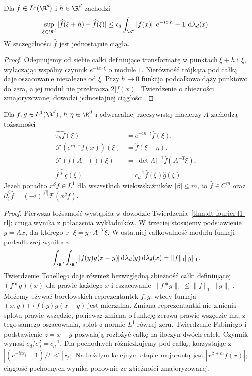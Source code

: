 \begin{wniosek}
\label{cor:dt-fourier-uniform-continuity}
Dla $f\in L^1(\R^d)$ i $h\in\R^d$ zachodzi
\[
 \sup_{\xi\in\R^d}|\widehat f(\xi+h)-\widehat f(\xi)|
 \le c_d\int_{\R^d}|f(x)|\,|e^{-ix\cdot h}-1|
 \,\mathrm d\lambda_d(x).
\]
W szczególności $\widehat f$ jest jednostajnie ciągła.
\end{wniosek}
\begin{proof}
Odejmujemy od siebie całki definiujące transformatę
w punktach $\xi+h$ i $\xi$, wyłączając wspólny
czynnik $e^{-ix\cdot\xi}$ o module $1$.
Nierówność trójkąta pod całką daje oszacowanie
niezależne od $\xi$. Przy $h\to0$ funkcja podcałkowa
dąży punktowo do zera, a jej moduł nie przekracza
$2|f(x)|$. Twierdzenie o zbieżności zmajoryzowanej
dowodzi jednostajnej ciągłości.
\end{proof}

\begin{stwierdzenie}
\label{prop:dt-fourier-l1-rules}
Dla $f,g\in L^1(\R^d)$, $h,\eta\in\R^d$ i odwracalnej
rzeczywistej macierzy $A$ zachodzą tożsamości
\[
\begin{aligned}
 \widehat{\tau_h f}(\xi)&=e^{-ih\cdot\xi}\widehat f(\xi),\\
 \mathcal F(e^{i\eta\cdot x}f(x))(\xi)&=\widehat f(\xi-\eta),\\
 \mathcal F(f(A\,\cdot))(\xi)&=
 |\det A|^{-1}\widehat f(A^{-T}\xi),\\
 \widehat{f*g}(\xi)&=c_d^{-1}\widehat f(\xi)\widehat g(\xi).
\end{aligned}
\]
Jeżeli ponadto $x^\beta f\in L^1$ dla wszystkich
wielowskaźników $|\beta|\le m$, to $\widehat f\in C^m$
oraz $\partial_\xi^\beta\widehat f=(-i)^{|\beta|}
\mathcal F(x^\beta f)$.
\end{stwierdzenie}
\begin{proof}
Pierwsza tożsamość wystąpiła w dowodzie
Twierdzenia~\ref{thm:dt-fourier-l1-rl}; druga wynika z
połączenia wykładników. W trzeciej stosujemy podstawienie
$y=Ax$, dla którego $x\cdot\xi=y\cdot A^{-T}\xi$.
W ostatniej całkowalność modułu funkcji podcałkowej
wynika z
\[
 \int_{\R^d}\int_{\R^d}|f(y)g(x-y)|
 \,\mathrm d\lambda_d(y)\,\mathrm d\lambda_d(x)
 =\|f\|_1\|g\|_1.
\]
Twierdzenie Tonellego daje również bezwzględną zbieżność
całki definiującej $(f*g)(x)$ dla prawie każdego $x$
i oszacowanie $\|f*g\|_1\le\|f\|_1\|g\|_1$.
Możemy używać borelowskich reprezentantek $f,g$;
wtedy funkcja $(x,y)\mapsto f(y)g(x-y)$ jest mierzalna.
Zmiana reprezentantki nie zmienia splotu prawie
wszędzie, ponieważ zmiana o funkcję zerową prawie
wszędzie ma, z tego samego oszacowania, splot o normie
$L^1$ równej zeru.
Twierdzenie Fubiniego i podstawienie $z=x-y$ pozwalają
rozłożyć całkę na iloczyn dwóch całek. Czynnik wynosi
$c_d/c_d^2=c_d^{-1}$.
Dla pochodnych różniczkujemy pod całką, korzystając z
$|(e^{-itx_j}-1)/t|\le |x_j|$. Na każdym kolejnym etapie
majorantą jest $|x^{\beta+e_j}f(x)|$; ciągłość
pochodnych wynika ponownie ze zbieżności zmajoryzowanej.
\end{proof}

